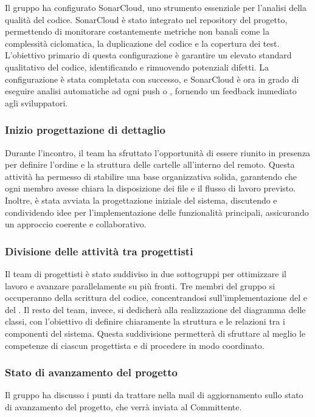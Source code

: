 \par Il gruppo ha configurato SonarCloud, uno strumento essenziale per l'analisi della qualità del codice. SonarCloud è stato integrato nel repository  del progetto, permettendo di monitorare costantemente metriche non banali come la complessità ciclomatica, la duplicazione del codice e la copertura dei test. L'obiettivo primario di questa configurazione è garantire un elevato standard qualitativo del codice, identificando e rimuovendo potenziali difetti. La configurazione è stata completata con successo, e SonarCloud è ora in grado di eseguire analisi automatiche ad ogni push o , fornendo un feedback immediato agli sviluppatori.

\subsubsection{Inizio progettazione di dettaglio}
\par Durante l'incontro, il team ha sfruttato l'opportunità di essere riunito in presenza per definire l'ordine e la struttura delle cartelle all'interno del  remoto. Questa attività ha permesso di stabilire una base organizzativa solida, garantendo che ogni membro avesse chiara la disposizione dei file e il flusso di lavoro previsto. Inoltre, è stata avviata la progettazione iniziale del sistema, discutendo e condividendo idee per l'implementazione delle funzionalità principali, assicurando un approccio coerente e collaborativo.

\subsubsection{Divisione delle attività tra progettisti}
\par Il team di progettisti è stato suddiviso in due sottogruppi per ottimizzare il lavoro e avanzare parallelamente su più fronti. Tre membri del gruppo si occuperanno della scrittura del codice, concentrandosi sull'implementazione del  e del . Il resto del team, invece, si dedicherà alla realizzazione del diagramma delle classi, con l'obiettivo di definire chiaramente la struttura e le relazioni tra i componenti del sistema. Questa suddivisione permetterà di sfruttare al meglio le competenze di ciascun progettista e di procedere in modo coordinato.

\subsubsection{Stato di avanzamento del progetto}
\par Il gruppo ha discusso i punti da trattare nella mail di aggiornamento sullo stato di avanzamento del progetto, che verrà inviata al Committente.
